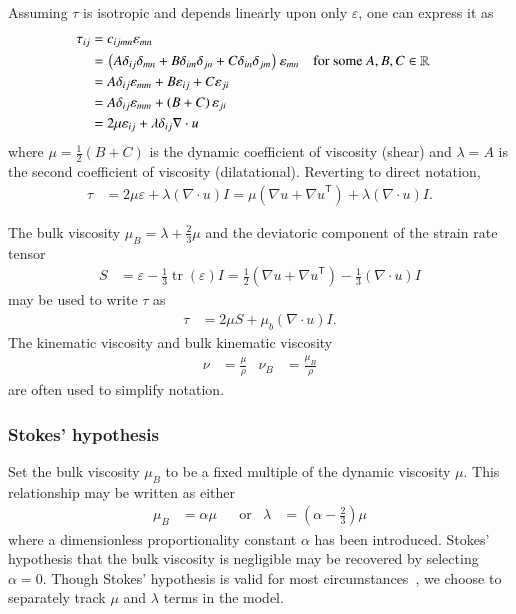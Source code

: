 \documentclass[letterpaper,11pt,nointlimits,reqno,draft]{amsart}
\newcommand{\trans}[1]{{#1}^{\ensuremath{\mathsf{T}}}}
\DeclareMathOperator{\trace}{tr}
\begin{document}
Assuming $\tau$ is isotropic and depends linearly upon only $\varepsilon$,
one can express it as
\begin{align}
\tau_{ij}
&= c_{ijmn} \varepsilon_{mn}
\notag \\
&= \left( A \delta_{ij} \delta_{mn}
        + B \delta_{im} \delta_{jn}
        + C \delta_{in} \delta_{jm}
    \right) \varepsilon_{mn}
&
&\text{for some }A, B, C\in\mathbb{R}
\notag \\
&= A \delta_{ij} \varepsilon_{mm} + B\varepsilon_{ij} + C\varepsilon_{ji}
\notag \\
&= A \delta_{ij} \varepsilon_{mm} + \left( B+C \right)\varepsilon_{ji}
\notag \\
&= 2 \mu \varepsilon_{ij} + \lambda\delta_{ij}\nabla\cdot{}u
\end{align}
where $\mu=\frac{1}{2}\left( B + C \right)$ is the dynamic coefficient of
viscosity (shear) and $\lambda=A$ is the second coefficient of viscosity
(dilatational).  Reverting to direct notation,
\begin{align}
\tau
&= 2 \mu \varepsilon + \lambda \left( \nabla\cdot{}u \right) I
\label{eq:taunewt}
 =   \mu \left( \nabla{}u + \trans{\nabla{}u} \right)
   + \lambda \left( \nabla\cdot{}u \right) I
.
\end{align}

The bulk viscosity $\mu_{B}=\lambda + \frac{2}{3}\mu$ and the deviatoric
component of the strain rate tensor
\begin{align}
  S &= \varepsilon - \frac{1}{3} \trace\left(\varepsilon\right) I
     = \frac{1}{2}\left(\nabla{}u + \trans{\nabla{}u}\right)
     - \frac{1}{3}\left(\nabla\cdot{}u\right)I
\end{align}
may be used to write $\tau$ as
\begin{align}
\label{eq:tauSmub}
  \tau &= 2 \mu S + \mu_b  \left( \nabla\cdot{}u \right) I
.
\end{align}
The kinematic viscosity and bulk kinematic viscosity
\begin{align}
 \nu &= \frac{\mu}{\rho} & \nu_{B} &= \frac{\mu_{B}}{\rho}
\end{align}
are often used to simplify notation.

\subsubsection{Stokes' hypothesis}
\label{sec:stokeshypothesis}

Set the bulk viscosity $\mu_{B}$ to be a fixed multiple of the dynamic
viscosity $\mu$.  This relationship may be written as either
\begin{align}
\label{eq:secondviscosityclaw}
\mu_{B} &= \alpha \mu
&
&\text{or}
&
\lambda &= \left( \alpha - \frac{2}{3} \right) \mu
\end{align}
where a dimensionless proportionality constant $\alpha$ has been introduced.
Stokes' hypothesis that the bulk viscosity is negligible may be recovered by
selecting $\alpha = 0$.  Though Stokes' hypothesis is valid for most
circumstances~\citep{GadelHak1995}, we choose to separately track $\mu$ and
$\lambda$ terms in the model.
\end{document}
